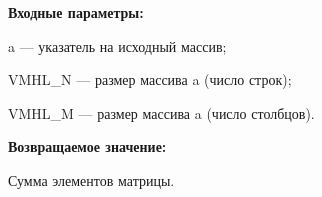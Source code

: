 \textbf{Входные параметры:}

 a --- указатель на исходный массив;
 
 VMHL\_N --- размер массива a (число строк);
 
 VMHL\_M --- размер массива a (число столбцов).

\textbf{Возвращаемое значение:}

 Сумма элементов матрицы.